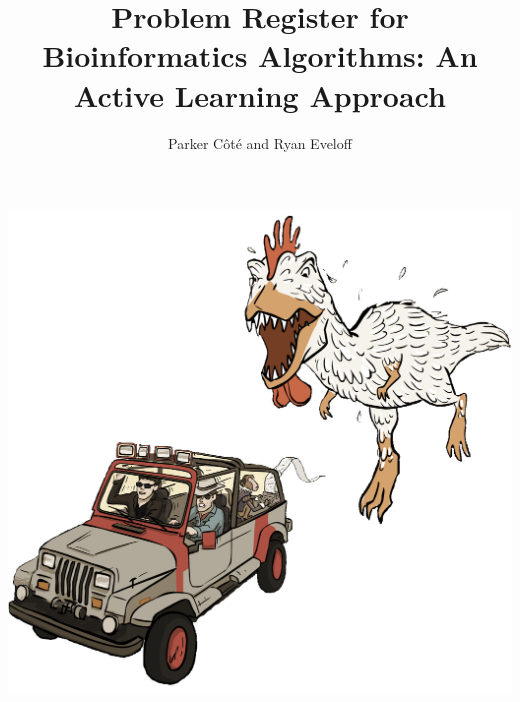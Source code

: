 \documentclass{article}
\title{\Large \textbf{Problem Register for\\Bioinformatics Algorithms: An Active Learning Approach}}
\author{Parker Côté and Ryan Eveloff}
\date{}
\begin{document}
\maketitle
\begin{center}
    \includegraphics[scale=0.25]{c0/c0_transparent.png}
\end{center}
\pagebreak
\end{document}
